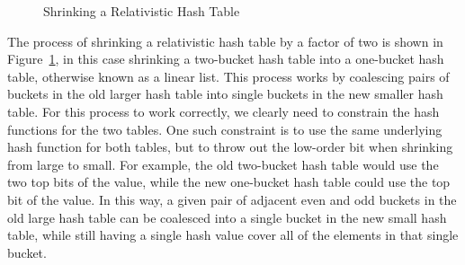 \begin{figure}
\centering
{}
\caption{Shrinking a Relativistic Hash Table}
\label{fig:datastruct:Shrinking a Relativistic Hash Table}
\end{figure}

The process of shrinking a relativistic hash table by a factor of two
is shown in
Figure~\ref{fig:datastruct:Shrinking a Relativistic Hash Table},
in this case shrinking a two-bucket hash table into a one-bucket
hash table, otherwise known as a linear list.
This process works by coalescing pairs of buckets in the old larger hash
table into single buckets in the new smaller hash table.
For this process to work correctly, we clearly need to constrain the hash
functions for the two tables.
One such constraint is to use the same underlying hash function for
both tables, but to throw out the low-order bit when shrinking from
large to small.
For example, the old two-bucket hash table would
use the two top bits of the value, while the new one-bucket hash table
could use the top bit of the value.
In this way, a given pair of adjacent even and odd buckets in the old
large hash table can be coalesced into a single bucket in the new small
hash table, while still having a single hash value cover all of the
elements in that single bucket.

